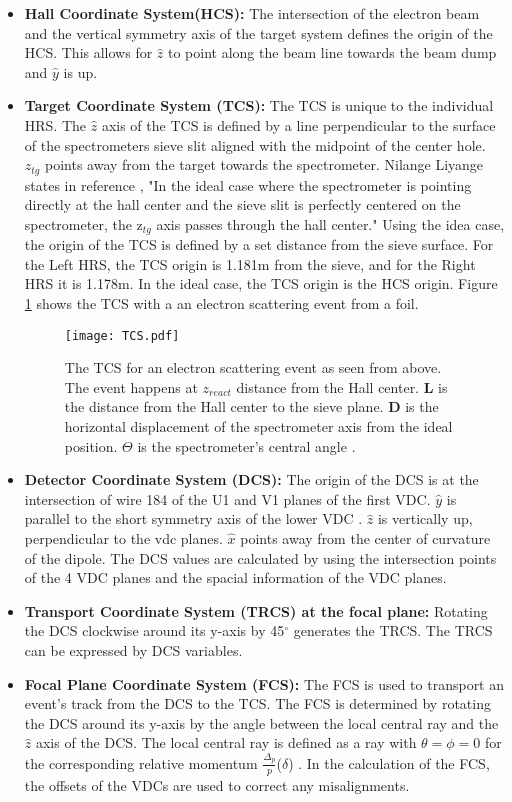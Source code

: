 \begin{itemize}
	\item \textbf{Hall Coordinate System(HCS):} The intersection of the electron beam and the vertical symmetry axis of the target system defines the origin of the HCS. This allows for $\hat{z}$ to point along the beam line towards the beam dump and $\hat{y}$ is up. 
	\item \textbf{Target Coordinate System (TCS):} The TCS is unique to the individual HRS. The $\hat{z}$ axis of the TCS is defined by a line perpendicular to the surface of the spectrometers sieve slit aligned with the midpoint of the center hole. $z_{tg}$ points away from the target towards the spectrometer. Nilange Liyange states in reference \cite{optics}, "In the ideal case where the spectrometer is pointing directly at the hall center and the sieve slit is perfectly centered on the spectrometer, the z$_{tg}$ axis passes through the hall center." Using the idea case, the origin of the TCS is defined by a set distance from the sieve surface. For the Left HRS, the TCS origin is 1.181m from the sieve, and for the Right HRS it is 1.178m. In the ideal case, the TCS origin is the HCS origin. Figure \ref{fig:TCS} shows the TCS with a an electron scattering event from a foil.  
	\begin{figure}[]
		\centering
		\texttt{[image: TCS.pdf]}
		\caption{The TCS for an electron scattering event as seen from above. The event happens at $z_{react}$ distance from the Hall center. \textbf{L} is the distance from the Hall center to the sieve plane. \textbf{D} is the horizontal displacement of the spectrometer axis from the ideal position. $\Theta$ is the spectrometer's central angle \cite{optics}. }
		\label{fig:TCS}
	\end{figure}
	\item \textbf{Detector Coordinate System (DCS):}  The origin of the DCS is at the intersection of wire 184 of the U1 and V1 planes of the first VDC. $\hat{y}$ is parallel to the short symmetry axis of the lower VDC \cite{espace}. $\hat{z}$ is vertically up, perpendicular to the vdc planes.  $\hat{x}$  points away from the center of curvature of the dipole. The DCS values are calculated by using the intersection points of the 4 VDC planes and the spacial information of the VDC planes.
	\item \textbf{Transport Coordinate System (TRCS) at the focal plane:} Rotating the DCS clockwise around its y-axis by 45$^\circ$ generates the TRCS. The TRCS can be expressed by  DCS variables. 	
	\item \textbf{Focal Plane Coordinate System (FCS):} The FCS is used to transport an event's track from the DCS to the TCS. The FCS is determined by rotating the DCS around its y-axis by the angle between the local central ray and the $\hat{z}$ axis of the DCS. The local central ray is defined as a ray with $\theta = \phi =0$ for the corresponding relative momentum $\frac{\Delta_p}{p}$($\delta$) \cite{optics}. In the calculation of the FCS, the offsets of the VDCs are used to correct any misalignments.  
\end{itemize}
